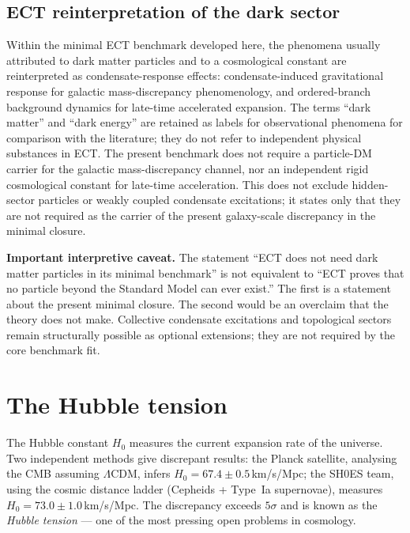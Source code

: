 \documentclass[11pt,a4paper]{article}
\begin{document}
\subsection{ECT reinterpretation of the dark sector}

Within the minimal ECT benchmark developed here, the phenomena usually attributed to dark matter particles and to a cosmological constant are reinterpreted as condensate-response effects: condensate-induced gravitational response for galactic mass-discrepancy phenomenology, and ordered-branch background dynamics for late-time accelerated expansion. The terms ``dark matter'' and ``dark energy'' are retained as labels for observational phenomena for comparison with the literature; they do not refer to independent physical substances in ECT. The present benchmark does not require a particle-DM carrier for the galactic mass-discrepancy channel, nor an independent rigid cosmological constant for late-time acceleration. This does not exclude hidden-sector particles or weakly coupled condensate excitations; it states only that they are not required as the carrier of the present galaxy-scale discrepancy in the minimal closure.

\textbf{Important interpretive caveat.} The statement ``ECT does not need dark matter particles in its minimal benchmark'' is not equivalent to ``ECT proves that no particle beyond the Standard Model can ever exist.'' The first is a statement about the present minimal closure. The second would be an overclaim that the theory does not make. Collective condensate excitations and topological sectors remain structurally possible as optional extensions; they are not required by the core benchmark fit.


\section{The Hubble tension}
\label{sec:pop_hubble}

The Hubble constant $H_0$ measures the current expansion rate of the universe. Two independent methods give discrepant results: the Planck satellite, analysing the CMB assuming $\Lambda$CDM, infers $H_0 = 67.4 \pm 0.5$\,km/s/Mpc; the SH0ES team, using the cosmic distance ladder (Cepheids + Type~Ia supernovae), measures $H_0 = 73.0 \pm 1.0$\,km/s/Mpc. The discrepancy exceeds $5\sigma$ and is known as the \emph{Hubble tension} --- one of the most pressing open problems in cosmology.
\end{document}

